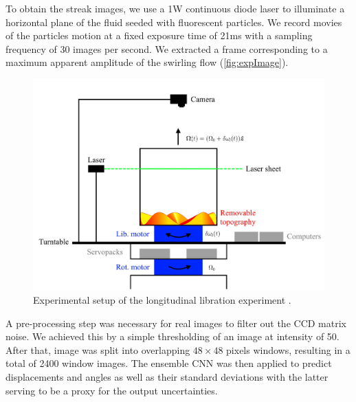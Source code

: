 \documentclass{svjour3}                     %
\begin{document}
To obtain the streak images, we use a 1W continuous diode laser to illuminate a horizontal plane of the fluid seeded with fluorescent particles. We record movies of the particles motion at a fixed exposure time of 21ms with a sampling frequency of 30 images per second. We extracted a frame corresponding to a maximum apparent amplitude of the swirling flow (\ref{fig:expImage}).
     
\begin{figure}
	\includegraphics[width=\textwidth]{figs/figureExperiment.jpg}
	\caption{Experimental setup of the longitudinal libration experiment \cite{MeisterMSC}.}
	\label{fig:MeisterMSC}
\end{figure}

A pre-processing step was necessary for real images to filter out the CCD matrix noise. We achieved this by a simple thresholding of an image at intensity of 50. After that, image was split into overlapping $48\times 48$ pixels windows, resulting in a total of 2400 window images. The ensemble CNN was then applied to predict displacements and angles as well as their standard deviations with the latter serving to be a proxy for the output uncertainties. 
\end{document}
